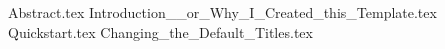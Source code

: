 \documentclass{article}
\begin{document}
  \begin{titlepage}
    \centering
    \vspace*{2cm}
    \titleblock [2cm]
    \vspace{1cm}  %
    \authorblock
    \vfill  %
    \location \\
    \dateblock \\
    \footnotesize { \texttt{\fullversion} }
  \end{titlepage}

  \attributionpage

  {Abstract.tex}
  \newpage
  {Introduction__or_Why_I_Created_this_Template.tex}
  {Quickstart.tex}
  {Changing_the_Default_Titles.tex}

  \printbibliography
\end{document}
